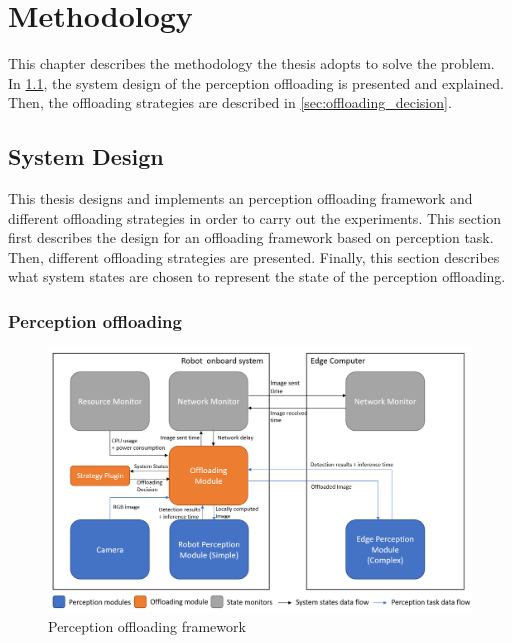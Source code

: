 \chapter{Methodology}\label{ch:methodology}

This chapter describes the methodology the thesis adopts to solve the problem. In \cref{sec:system_design}, the system design of the perception offloading is presented and explained. Then, the offloading strategies are described in \cref{sec:offloading_decision}. 

\section{System Design}\label{sec:system_design}

This thesis designs and implements an perception offloading framework and different offloading strategies in order to carry out the experiments. This section first describes the design for an offloading framework based on perception task. Then, different offloading strategies are presented. Finally, this section describes what system states are chosen to represent the state of the perception offloading.

\subsection{Perception offloading}

\begin{figure}[htp]
    \centering
    \includegraphics[width=\linewidth]{figures/setup/design.png}
    \caption{Perception offloading framework}
    \label{fig:perception_offloading_framework}
\end{figure}


